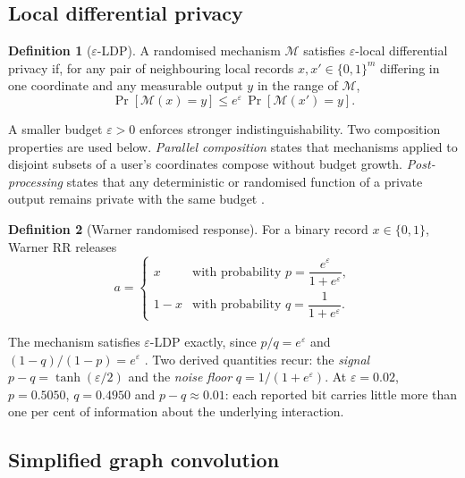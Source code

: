 \documentclass[pdflatex,sn-basic,Numbered]{sn-jnl}
\theoremstyle{plain}
\theoremstyle{remark}
\theoremstyle{definition}
\newtheorem{definition}{Definition}
\newcommand{\eps}{\varepsilon}
\newcommand{\Prob}{\Pr}
\begin{document}
\subsection{Local differential privacy}

\begin{definition}[$\eps$-LDP]\label{def:ldp}
A randomised mechanism $\mathcal{M}$ satisfies $\eps$-local differential privacy if, for any pair of neighbouring local records $x,x'\in\{0,1\}^{m}$ differing in one coordinate and any measurable output $y$ in the range of $\mathcal{M}$,
\begin{equation}\label{eq:ldp}
\Prob[\mathcal{M}(x)=y]\le e^{\eps}\,\Prob[\mathcal{M}(x')=y].
\end{equation}
\end{definition}

A smaller budget $\eps>0$ enforces stronger indistinguishability. Two composition properties are used below. \emph{Parallel composition} states that mechanisms applied to disjoint subsets of a user's coordinates compose without budget growth. \emph{Post-processing} states that any deterministic or randomised function of a private output remains private with the same budget \cite{dwork2014algorithmic}.

\begin{definition}[Warner randomised response]\label{def:rr}
For a binary record $x\in\{0,1\}$, Warner RR releases
\begin{equation}\label{eq:rr}
a=\begin{cases} x & \text{with probability } p=\dfrac{e^{\eps}}{1+e^{\eps}},\\[2mm] 1-x & \text{with probability } q=\dfrac{1}{1+e^{\eps}}.\end{cases}
\end{equation}
\end{definition}

The mechanism satisfies $\eps$-LDP exactly, since $p/q=e^{\eps}$ and $(1-q)/(1-p)=e^{\eps}$ \cite{warner1965rr,dwork2014algorithmic}. Two derived quantities recur: the \emph{signal} $p-q=\tanh(\eps/2)$ and the \emph{noise floor} $q=1/(1+e^{\eps})$. At $\eps=0.02$, $p=0.5050$, $q=0.4950$ and $p-q\approx0.01$: each reported bit carries little more than one per cent of information about the underlying interaction.

\subsection{Simplified graph convolution}
\end{document}
